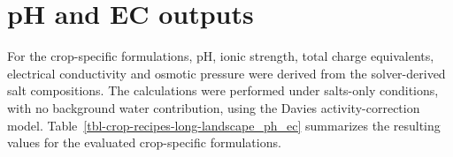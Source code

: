 \documentclass[
  letterpaper,
  DIV=11,
  numbers=noendperiod]{scrreprt}
\begin{document}
\section{pH and EC outputs}\label{ph-and-ec-outputs}

For the crop-specific formulations, pH, ionic strength, total charge
equivalents, electrical conductivity and osmotic pressure were derived
from the solver-derived salt compositions. The calculations were
performed under salts-only conditions, with no background water
contribution, using the Davies activity-correction model.
Table~\ref{tbl-crop-recipes-long-landscape_ph_ec} summarizes the
resulting values for the evaluated crop-specific formulations.

\setlength{\LTpre}{16pt}
\setlength{\LTpost}{8pt}
\renewcommand{\arraystretch}{0.85}
\begingroup\fontsize{7}{9}\selectfont
\end{document}
